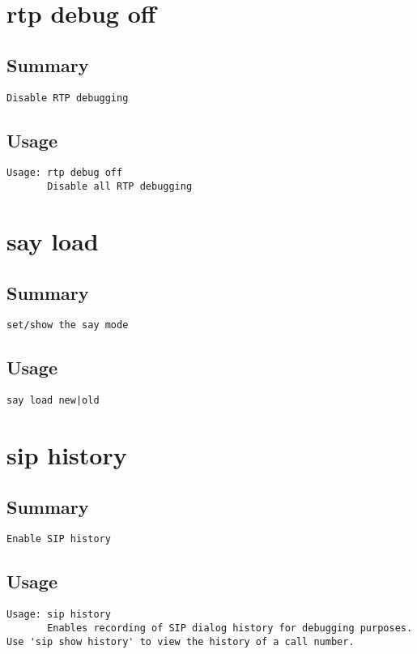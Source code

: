 \section{rtp debug off}
\subsection{Summary}
\begin{verbatim}
Disable RTP debugging
\end{verbatim}
\subsection{Usage}
\begin{verbatim}
Usage: rtp debug off
       Disable all RTP debugging

\end{verbatim}


\section{say load}
\subsection{Summary}
\begin{verbatim}
set/show the say mode
\end{verbatim}
\subsection{Usage}
\begin{verbatim}
say load new|old
\end{verbatim}


\section{sip history}
\subsection{Summary}
\begin{verbatim}
Enable SIP history
\end{verbatim}
\subsection{Usage}
\begin{verbatim}
Usage: sip history
       Enables recording of SIP dialog history for debugging purposes.
Use 'sip show history' to view the history of a call number.

\end{verbatim}


